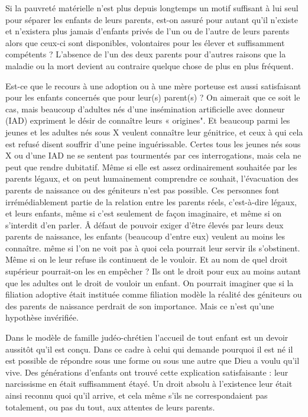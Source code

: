  Si la pauvreté matérielle n'est plus depuis longtemps un motif suffisant à lui seul pour séparer les enfants de leurs parents, est-on assuré pour autant qu'il n'existe et n'existera plus jamais d'enfants privés de l'un ou de l'autre de leurs parents alors que ceux-ci sont disponibles, volontaires pour les élever et suffisamment compétents ? L'absence de l'un des deux parents pour d'autres raisons que la maladie ou la mort devient au contraire quelque chose de plus en plus fréquent. 

 Est-ce que le recours à une adoption ou à une mère porteuse est aussi satisfaisant pour les enfants concernés que pour leur(s) parent(s) ? On aimerait que ce soit le cas, mais beaucoup d'adultes nés d'une insémination artificielle avec donneur (IAD) expriment le désir de connaître leurs « origines". Et beaucoup parmi les jeunes et les adultes nés sous X veulent connaître leur génitrice, et ceux à qui cela est refusé disent souffrir d'une peine inguérissable. Certes tous les jeunes nés sous X ou d'une IAD ne se sentent pas tourmentés par ces interrogations, mais cela ne peut que rendre dubitatif. Même si elle est assez ordinairement souhaitée par les parents légaux, et on peut humainement comprendre ce souhait, l'évacuation des parents de naissance ou des géniteurs n'est pas possible. Ces personnes font irrémédiablement partie de la relation entre les parents réels, c'est-à-dire légaux, et leurs enfants, même si c'est seulement de façon imaginaire, et même si on s'interdit d'en parler. Â défaut de pouvoir exiger d'être élevés par leurs deux parents de naissance, les enfants (beaucoup d'entre eux) veulent au moins les connaître.  même si l'on ne voit pas à quoi cela pourrait leur servir ils s'obstinent. Même si on le leur refuse ils continuent de le vouloir. Et au nom de quel droit supérieur pourrait-on les en empêcher ? Ils ont le droit pour eux au moins autant que les adultes ont le droit de vouloir un enfant. On pourrait imaginer que si la filiation adoptive était instituée comme filiation modèle la réalité des géniteurs ou des parents de naissance perdrait de son importance. Mais ce n'est qu'une hypothèse invérifiée.


 
 

 Dans le modèle de famille judéo-chrétien  l'accueil de tout enfant est un devoir aussitôt qu'il est conçu. Dans ce cadre à celui qui demande pourquoi il est né il est possible de répondre sous une forme ou sous une autre  que Dieu a voulu qu'il vive. Des générations d'enfants ont trouvé cette explication satisfaisante : leur narcissisme en était suffisamment étayé. Un droit absolu à l'existence leur était ainsi reconnu quoi qu'il arrive, et cela même s'ils ne correspondaient pas totalement, ou pas du tout, aux attentes de leurs parents.
  
